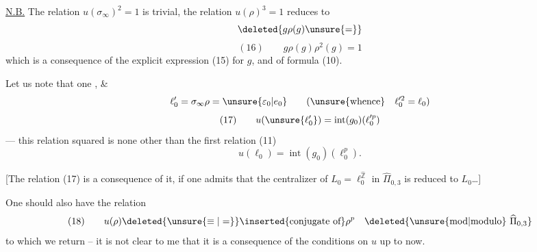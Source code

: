 
\uline{N.B.} The relation  $u(\sigma_\infty)^2=1$ is trivial, the relation $u(\rho)^3=1$ reduces to
\[
\deleted{g\rho(g)\unsure{=}}
\]
\[
(16)\qquad g\rho(g)\rho^2(g)=1
\]
which is a consequence of the explicit expression (15) for $g$, and of formula (10).

Let us note that one  , \& 
\[
\ell'_0=\sigma_\infty\rho=\unsure{\varepsilon_0|e_0}\qquad
(\text{\unsure{whence}}\quad \ell_0^{\prime 2}=\ell_0)
\]
\[
(17)\qquad
u(\unsure{\ell'_0})
=\operatorname{int}(g_0)(\ell_0^{\prime p})
\]
--- this relation  squared is none other than the first relation (11)
\[
u(\ell_0)=\operatorname{int}(g_0)(\ell_0^p).
\]

[The relation (17) is a consequence of it, if one admits that the centralizer of $L_0=\ell_0^{\widehat{\mathbb Z}}$ in $\widehat{\Pi}_{0,3}$ is reduced to $L_0$\ldots]

One should also have the relation
\[
(18)\qquad u(\rho)\deleted{\unsure{\equiv|=}}\inserted{\text{conjugate of}}\rho^p
\quad\deleted{\text{\unsure{mod|modulo}}\ \widehat{\Pi}_{0,3}}
\]
 to which we  return -- it is not clear to me that it is a consequence of the conditions  on $u$ up to now.
